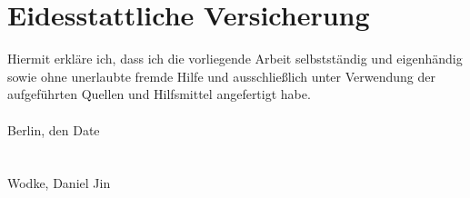 \section*{Eidesstattliche Versicherung}
Hiermit erkläre ich, dass ich die vorliegende Arbeit selbstständig und eigenhändig sowie ohne 
unerlaubte fremde Hilfe und ausschließlich unter Verwendung der aufgeführten Quellen und Hilfsmittel 
angefertigt habe.\\
\\
Berlin, den Date\\
\vspace{1cm}\\
\underline{\hspace{5cm}}\\
Wodke, Daniel Jin